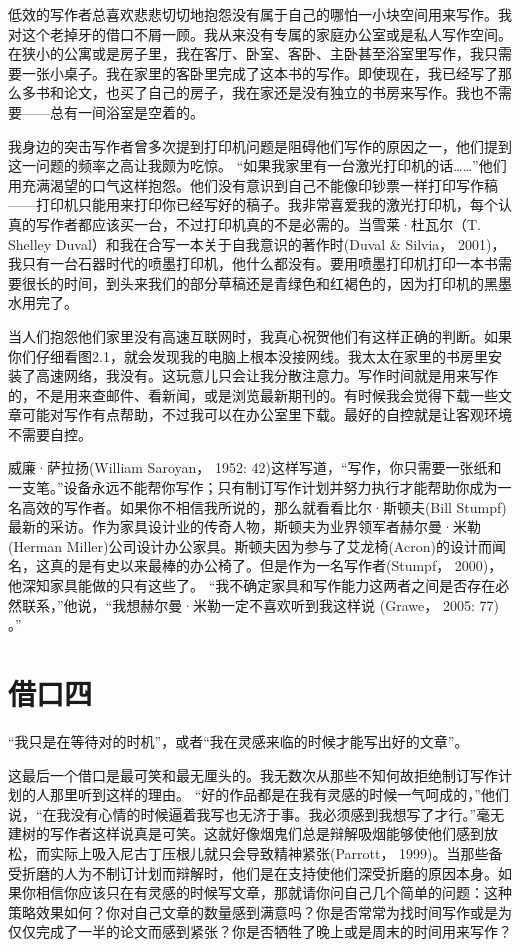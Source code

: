 低效的写作者总喜欢悲悲切切地抱怨没有属于自己的哪怕一小块空间用来写作。我对这个老掉牙的借口不屑一顾。我从来没有专属的家庭办公室或是私人写作空间。在狭小的公寓或是房子里，我在客厅、卧室、客卧、主卧甚至浴室里写作，我只需要一张小桌子。我在家里的客卧里完成了这本书的写作。即使现在，我已经写了那么多书和论文，也买了自己的房子，我在家还是没有独立的书房来写作。我也不需要——总有一间浴室是空着的。

我身边的突击写作者曾多次提到打印机问题是阻碍他们写作的原因之一，他们提到这一问题的频率之高让我颇为吃惊。 “如果我家里有一台激光打印机的话……”他们用充满渴望的口气这样抱怨。他们没有意识到自己不能像印钞票一样打印写作稿——打印机只能用来打印你已经写好的稿子。我非常喜爱我的激光打印机，每个认真的写作者都应该买一台，不过打印机真的不是必需的。当雪莱·杜瓦尔（T. Shelley Duval）和我在合写一本关于自我意识的著作时(Duval \& Silvia， 2001)，我只有一台石器时代的喷墨打印机，他什么都没有。要用喷墨打印机打印一本书需要很长的时间，到头来我们的部分草稿还是青绿色和红褐色的，因为打印机的黑墨水用完了。

当人们抱怨他们家里没有高速互联网时，我真心祝贺他们有这样正确的判断。如果你们仔细看图2.1，就会发现我的电脑上根本没接网线。我太太在家里的书房里安装了高速网络，我没有。这玩意儿只会让我分散注意力。写作时间就是用来写作的，不是用来查邮件、看新闻，或是浏览最新期刊的。有时候我会觉得下载一些文章可能对写作有点帮助，不过我可以在办公室里下载。最好的自控就是让客观环境不需要自控。

威廉·萨拉扬(William Saroyan， 1952: 42)这样写道，“写作，你只需要一张纸和一支笔。”设备永远不能帮你写作；只有制订写作计划并努力执行才能帮助你成为一名高效的写作者。如果你不相信我所说的，那么就看看比尔·斯顿夫(Bill Stumpf)最新的采访。作为家具设计业的传奇人物，斯顿夫为业界领军者赫尔曼·米勒(Herman Miller)公司设计办公家具。斯顿夫因为参与了艾龙椅(Acron)的设计而闻名，这真的是有史以来最棒的办公椅了。但是作为一名写作者(Stumpf， 2000)，他深知家具能做的只有这些了。 “我不确定家具和写作能力这两者之间是否存在必然联系，”他说，“我想赫尔曼·米勒一定不喜欢听到我这样说
(Grawe， 2005: 77) 。”


\section{借口四}
“我只是在等待对的时机”，或者“我在灵感来临的时候才能写出好的文章”。

这最后一个借口是最可笑和最无厘头的。我无数次从那些不知何故拒绝制订写作计划的人那里听到这样的理由。 “好的作品都是在我有灵感的时候一气呵成的，”他们说，“在我没有心情的时候逼着我写也无济于事。我必须感到我想写了才行。”毫无建树的写作者这样说真是可笑。这就好像烟鬼们总是辩解吸烟能够使他们感到放松，而实际上吸入尼古丁压根儿就只会导致精神紧张(Parrott， 1999)。当那些备受折磨的人为不制订计划而辩解时，他们是在支持使他们深受折磨的原因本身。如果你相信你应该只在有灵感的时候写文章，那就请你问自己几个简单的问题：这种策略效果如何？你对自己文章的数量感到满意吗？你是否常常为找时间写作或是为仅仅完成了一半的论文而感到紧张？你是否牺牲了晚上或是周末的时间用来写作？

